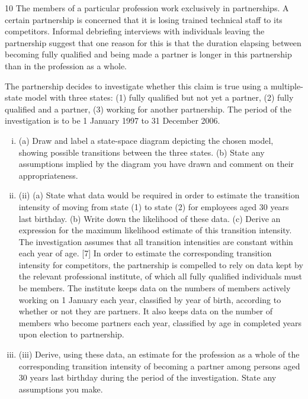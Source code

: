 \documentclass[a4paper,12pt]{article}
\begin{document}
\begin{enumerate}
10
The members of a particular profession work exclusively in partnerships. A certain partnership is concerned that it is losing trained technical staff to its competitors. Informal debriefing interviews with individuals leaving the partnership
suggest that one reason for this is that the duration elapsing between becoming fully qualified and being made a partner is longer in this partnership than in the profession as a whole.

The partnership decides to investigate whether this claim is true using a multiple-state model with three states: (1) fully qualified but not yet a partner, (2) fully qualified and a partner, (3) working for another partnership. The period of the investigation is to
be 1 January 1997 to 31 December 2006.
\begin{enumerate}[(i)]
\item (a) Draw and label a state-space diagram depicting the chosen model,
showing possible transitions between the three states.
(b) State any assumptions implied by the diagram you have drawn and
comment on their appropriateness.

\item (ii)
(a) State what data would be required in order to estimate the transition
intensity of moving from state (1) to state (2) for employees aged 30
years last birthday.
(b) Write down the likelihood of these data.
(c) Derive an expression for the maximum likelihood estimate of this
transition intensity.
The investigation assumes that all transition intensities are constant within
each year of age.
[7]
In order to estimate the corresponding transition intensity for competitors, the
partnership is compelled to rely on data kept by the relevant professional institute, of
which all fully qualified individuals must be members. The institute keeps data on the
numbers of members actively working on 1 January each year, classified by year of
birth, according to whether or not they are partners. It also keeps data on the number
of members who become partners each year, classified by age in completed years
upon election to partnership.
\item (iii)
Derive, using these data, an estimate for the profession as a whole of the
corresponding transition intensity of becoming a partner among persons aged
30 years last birthday during the period of the investigation. State any
assumptions you make.
\end{enumerate}


\end{enumerate}
\end{document}
